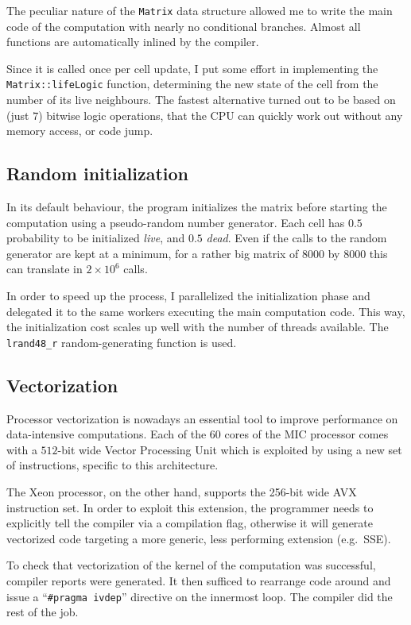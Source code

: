 \documentclass[a4paper,11pt]{article}
\newcommand{\code}[1]{\texttt{#1}}
\def\+{\discretionary{}{}{}}
\begin{document}
The peculiar nature of the \code{Matrix} data structure allowed me to write the main code of the computation with nearly no conditional branches. Almost all functions are automatically inlined by the compiler.

Since it is called once per cell update, I put some effort in implementing the \code{Matrix::\+lifeLogic} function, determining the new state of the cell from the number of its live neighbours. The fastest alternative turned out to be based on (just $7$) bitwise logic operations, that the CPU can quickly work out without any memory access, or code jump.

\subsection{Random initialization}

In its default behaviour, the program initializes the matrix before starting the computation using a pseudo-random number generator. Each cell has $0.5$ probability to be initialized \emph{live}, and $0.5$ \emph{dead}. Even if the calls to the random generator are kept at a minimum, for a rather big matrix of $8000$ by $8000$ this can translate in $2 \times 10^6$ calls.

In order to speed up the process, I parallelized the initialization phase and delegated it to the same workers executing the main computation code. This way, the initialization cost scales up well with the number of threads available. The \code{lrand48\_r} random-generating function is used.

\subsection{Vectorization}

Processor vectorization is nowadays an essential tool to improve performance on data-intensive computations. Each of the $60$ cores of the MIC processor comes with a $512$-bit wide Vector Processing Unit which is exploited by using a new set of instructions, specific to this architecture.

The Xeon processor, on the other hand, supports the 256-bit wide AVX instruction set. In order to exploit this extension, the programmer needs to explicitly tell the compiler via a compilation flag, otherwise it will generate vectorized code targeting a more generic, less performing extension (e.g.\ SSE).

To check that vectorization of the kernel of the computation was successful, compiler reports were generated. It then sufficed to rearrange code around and issue a ``\code{\#pragma ivdep}'' directive on the innermost loop. The compiler did the rest of the job.
\end{document}
